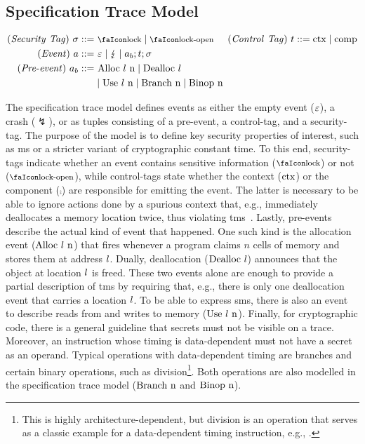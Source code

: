 \documentclass[dvipsnames,conference]{IEEEtran}
\theoremstyle{definition}
\begin{document}
\subsection{Specification Trace Model}\label{subsec:propdefs}

\vspace{-2em}
\begin{gather*}
  \begin{aligned}
  \mi{(Security\ Tag)}~\sigma\bnfdef&\ \lock \mid \unlock\hspace{0.5cm}
  \mi{(Control\ Tag)}~\sandboxtag\bnfdef \ctx\mid\comp\\
  \mi{(Event)}~\event\bnfdef&\ \emptyevent \mid \lightning \mid \event[_{b}];\sandboxtag;\sigma \\
  \mi{(Pre\text{-}event)}~\event[_{b}]\bnfdef&\ \ev{Alloc\ \loc\ n} \mid \ev{Dealloc\ \loc} \\
                                             & \mid \ev{Use\ \loc\ n} \mid \ev{Branch\ n} \mid \ev{Binop\ n} \\
  \end{aligned}
\end{gather*}

The specification trace model defines events as either the empty event ($\varepsilon$), a crash ($\lightning$), or as tuples consisting of a pre-event, a control-tag, and a security-tag.
The purpose of the model is to define key security properties of interest, such as \gls*{ms} or a stricter variant of cryptographic constant time.
To this end, security-tags indicate whether an event contains sensitive information ($\lock$) or not ($\unlock$), while control-tags state whether the context ($\text{ctx}$) or the component ($\comp$) are responsible for emitting the event.
The latter is necessary to be able to ignore actions done by a spurious context that, e.g., immediately deallocates a memory location twice, thus violating \gls*{tms}~\cite{nagarakatte2010cets}.
Lastly, pre-events describe the actual kind of event that happened.
One such kind is the allocation event ($\text{Alloc\ \ensuremath l\ n}$) that fires whenever a program claims $n$ cells of memory and stores them at address $l$.
Dually, deallocation ($\text{Dealloc\ \ensuremath l}$) announces that the object at location $l$ is freed.
These two events alone are enough to provide a partial description of \gls*{tms} by requiring that, e.g., there is only one deallocation event that carries a location $l$.
To be able to express \gls*{sms}, there is also an event to describe reads from and writes to memory ($\text{Use\ \ensuremath l\ n}$).
Finally, for cryptographic code, there is a general guideline that secrets must not be visible on a trace.
Moreover, an instruction whose timing is data-dependent must not have a secret as an operand.
Typical operations with data-dependent timing are branches and certain binary operations, such as division\footnote{This is highly architecture-dependent, but division is an operation that serves as a classic example for a data-dependent timing instruction, e.g., \cite[p.~755]{arm-refman}.}.
Both operations are also modelled in the specification trace model ($\ev{Branch\ n}$ and $\text{Binop\ n}$).
\end{document}
